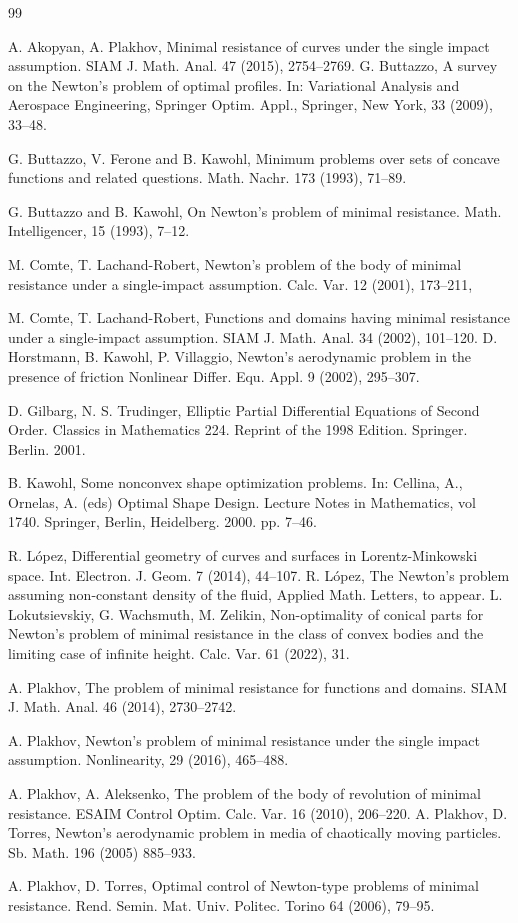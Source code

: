 \documentclass[a4paper,12pt]{amsart}
\theoremstyle{definition}
\begin{document}
\begin{thebibliography}{99}

 A. Akopyan, A.  Plakhov,   Minimal resistance of curves under the single impact assumption. SIAM J. Math. Anal. 47  (2015), 2754--2769.
 G. Buttazzo, A survey on the Newton's problem of optimal profiles. In: Variational Analysis and Aerospace Engineering, Springer Optim. Appl., Springer, New York, 33 (2009), 33--48.   

 G. Buttazzo, V. Ferone and B. Kawohl, Minimum problems over sets of concave functions and related questions. Math. Nachr. 173 (1993), 71--89.

G. Buttazzo and B. Kawohl, On Newton's problem of minimal resistance. Math. Intelligencer, 15 (1993), 7--12.
 
 M. Comte, T. Lachand-Robert, Newton's problem of the body of minimal resistance under a single-impact assumption. Calc. Var.   12 (2001),  173--211, 

 M. Comte, T. Lachand-Robert,  Functions and domains having minimal resistance under a single-impact assumption. SIAM J. Math. Anal. 34 (2002), 101--120. 
 D. Horstmann, B. Kawohl, P. Villaggio, Newton's aerodynamic problem in the presence of friction Nonlinear Differ. Equ. Appl. 9 (2002), 295--307.

 D. Gilbarg, N. S. Trudinger, Elliptic Partial Differential Equations of Second Order. Classics in Mathematics 224. Reprint of the 1998 Edition. Springer. Berlin. 2001.

 B. Kawohl,  Some nonconvex shape optimization problems. In: Cellina, A., Ornelas, A. (eds) Optimal Shape Design. Lecture Notes in Mathematics, vol 1740. Springer, Berlin, Heidelberg. 2000. pp. 7--46.

 R. L\'opez, Differential geometry of curves and surfaces in Lorentz-Minkowski space.   Int. Electron. J. Geom.   7 (2014), 44--107.
 R. L\'opez, The Newton's problem assuming non-constant density of the fluid, Applied Math. Letters, to appear.
 L. Lokutsievskiy, G. Wachsmuth, M. Zelikin,  Non-optimality of conical parts for Newton's problem of minimal resistance in the class of convex bodies and the limiting case of infinite height. Calc. Var. 61 (2022), 31. 

 A. Plakhov, The problem of minimal resistance for functions and domains. SIAM J. Math. Anal. 46 (2014), 2730--2742.

 A.  Plakhov, Newton's problem of minimal resistance under the single impact assumption. Nonlinearity, 29 (2016), 465--488.

  A. Plakhov, A. Aleksenko, The problem of the body of revolution of minimal resistance. ESAIM Control
Optim. Calc. Var. 16 (2010), 206--220.
 A. Plakhov, D. Torres, Newton's aerodynamic problem in media of chaotically moving particles. Sb. Math. 196 (2005) 885--933.

 A. Plakhov, D. Torres, Optimal control of Newton-type problems of minimal resistance. 
Rend. Semin. Mat. Univ. Politec. Torino 64 (2006),   79--95.


\end{thebibliography}
\end{document}
